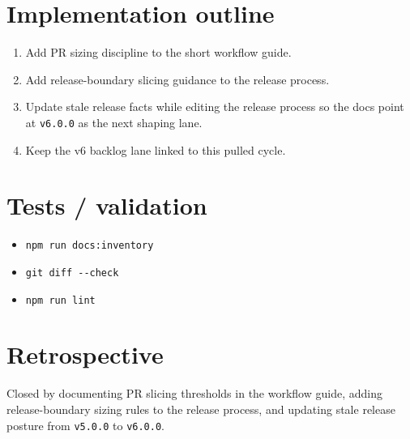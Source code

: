 \section{Implementation outline}\label{record-205-implementation-outline}

\begin{enumerate}
\def\labelenumi{\arabic{enumi}.}
\tightlist
\item
  Add PR sizing discipline to the short workflow guide.
\item
  Add release-boundary slicing guidance to the release process.
\item
  Update stale release facts while editing the release process so the docs point at \texttt{v\allowbreak{}6\allowbreak{}.\allowbreak{}0\allowbreak{}.\allowbreak{}0} as the next shaping lane.
\item
  Keep the v6 backlog lane linked to this pulled cycle.
\end{enumerate}

\section{Tests / validation}\label{record-205-tests-validation}

\begin{itemize}
\tightlist
\item
  \texttt{n\allowbreak{}p\allowbreak{}m\allowbreak{} \allowbreak{}r\allowbreak{}u\allowbreak{}n\allowbreak{} \allowbreak{}d\allowbreak{}o\allowbreak{}c\allowbreak{}s\allowbreak{}:\allowbreak{}i\allowbreak{}n\allowbreak{}v\allowbreak{}e\allowbreak{}n\allowbreak{}t\allowbreak{}o\allowbreak{}r\allowbreak{}y}
\item
  \texttt{g\allowbreak{}i\allowbreak{}t\allowbreak{} \allowbreak{}d\allowbreak{}i\allowbreak{}f\allowbreak{}f\allowbreak{} \allowbreak{}-\allowbreak{}-\allowbreak{}c\allowbreak{}h\allowbreak{}e\allowbreak{}c\allowbreak{}k}
\item
  \texttt{n\allowbreak{}p\allowbreak{}m\allowbreak{} \allowbreak{}r\allowbreak{}u\allowbreak{}n\allowbreak{} \allowbreak{}l\allowbreak{}i\allowbreak{}n\allowbreak{}t}
\end{itemize}

\section{Retrospective}\label{record-205-retrospective}

Closed by documenting PR slicing thresholds in the workflow guide, adding release-boundary sizing rules to the release process, and updating stale release posture from \texttt{v\allowbreak{}5\allowbreak{}.\allowbreak{}0\allowbreak{}.\allowbreak{}0} to \texttt{v\allowbreak{}6\allowbreak{}.\allowbreak{}0\allowbreak{}.\allowbreak{}0}.


